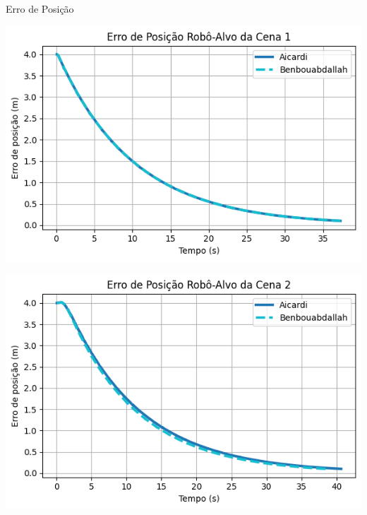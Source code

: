 \documentclass{beamer}
\begin{document}
\begin{frame}{Erro de Posição}
\begin{minipage}{0.48\linewidth}
    \centering
    \includegraphics[width=\linewidth]{Figuras/ErroPosição_Cena_1.png}
  \end{minipage}
  \hfill
  \begin{minipage}{0.48\linewidth}
    \centering
    \includegraphics[width=\linewidth]{Figuras/ErroPosição_Cena_2.png}
  \end{minipage}
\end{frame}
\end{document}

